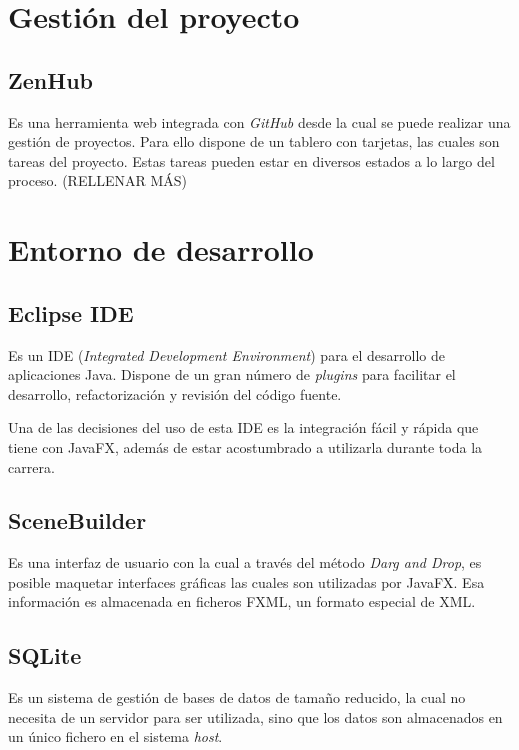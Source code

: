 \section{Gestión del proyecto}\label{gestion_del_proyecto}

\subsection{ZenHub}\label{zenhub}

Es una herramienta web integrada con \emph{GitHub} desde la cual se puede realizar una gestión de proyectos. Para ello dispone de un tablero con tarjetas, las cuales son tareas del proyecto. Estas tareas pueden estar en diversos estados a lo largo del proceso. (RELLENAR MÁS)

\section{Entorno de desarrollo}\label{entorno_de_desarrollo}

\subsection{Eclipse IDE}\label{eclipse_ide}

Es un IDE (\emph{Integrated Development Environment}) para el desarrollo de aplicaciones Java. Dispone de un gran número de \emph{plugins} para facilitar el desarrollo, refactorización y revisión del código fuente.

Una de las decisiones del uso de esta IDE es la integración fácil y rápida que tiene con JavaFX, además de estar acostumbrado a utilizarla durante toda la carrera.

\subsection{SceneBuilder}\label{scenebuilder}

Es una interfaz de usuario con la cual a través del método \emph{Darg and Drop}, es posible maquetar interfaces gráficas las cuales son utilizadas por JavaFX. Esa información es almacenada en ficheros FXML, un formato especial de XML.

\subsection{SQLite}\label{sqlite}

Es un sistema de gestión de bases de datos de tamaño reducido, la cual no necesita de un servidor para ser utilizada, sino que los datos son almacenados en un único fichero en el sistema \emph{host}.

